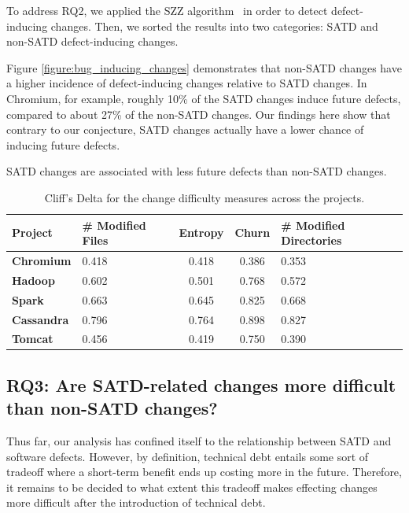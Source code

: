 To address RQ2, we applied the SZZ algorithm~\cite{sliwerski-msr-2005} in order to detect defect-inducing changes. Then, we sorted the results into two categories: SATD and non-SATD defect-inducing changes.




Figure \ref{figure:bug_inducing_changes} demonstrates that non-SATD changes have a higher incidence of defect-inducing changes relative to SATD changes.  In Chromium, for example, roughly 10\% of the SATD changes induce future defects, compared to about 27\% of the non-SATD changes. Our findings here show that contrary to our conjecture, SATD changes actually have a lower chance of inducing future defects.

\begin{myboxii}
	SATD changes are associated with less future defects than non-SATD changes.
\end{myboxii}




\begin{table}[tb!]
	\setlength{\tabcolsep}{.7\tabcolsep}
	\centering
	\caption{Cliff's Delta for the change difficulty measures across the projects.}
	\begin{tabular}{l|C{1.5in}|c|c|C{2in}}
		\hline
		\textbf{Project}   & {\bf \# Modified Files}    & {\bf Entropy} & {\bf Churn} & {\bf\# Modified Directories}    \\ \hline
		\textbf{Chromium}  & 0.418 & 0.418   & 0.386 & 0.353 \\ \hline
		\textbf{Hadoop}    & 0.602 & 0.501   & 0.768 & 0.572 \\ \hline
		\textbf{Spark}     & 0.663 & 0.645   & 0.825 & 0.668 \\ \hline
		\textbf{Cassandra} & 0.796 & 0.764   & 0.898 & 0.827 \\ \hline
		\textbf{Tomcat}    & 0.456 & 0.419   & 0.750 & 0.390 \\ \hline
	\end{tabular}
	\label{table:cliff_deltas_RQ3}
\end{table}

\subsection*{RQ3: Are SATD-related changes more difficult than non-SATD changes?}

 Thus far, our analysis has confined itself to the relationship between SATD and software defects. However, by definition, technical debt entails some sort of tradeoff where a short-term benefit ends up costing more in the future. Therefore, it remains to be decided to what extent this tradeoff makes effecting changes more difficult after the introduction of technical debt.

